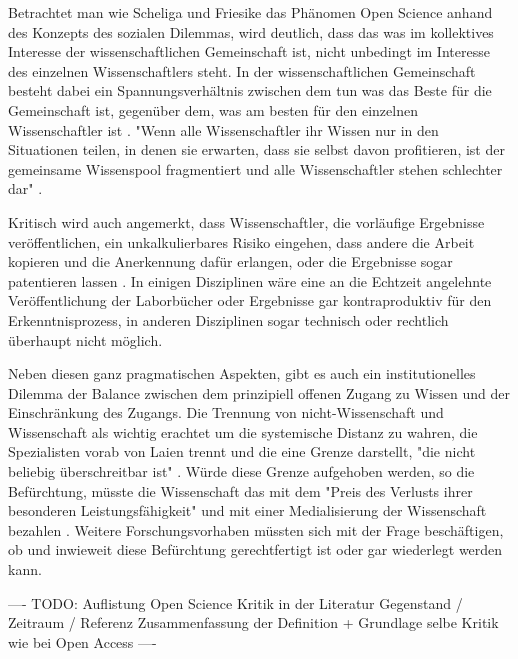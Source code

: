 Betrachtet man wie Scheliga und Friesike das Phänomen Open Science anhand des Konzepts des sozialen Dilemmas, wird deutlich, dass das was im kollektives Interesse der wissenschaftlichen Gemeinschaft ist, nicht unbedingt im Interesse des einzelnen Wissenschaftlers steht. In der wissenschaftlichen Gemeinschaft besteht dabei ein Spannungsverhältnis zwischen dem tun was das Beste für die Gemeinschaft ist, gegenüber dem, was am besten für den einzelnen Wissenschaftler ist \cite{Ekins_2014} \cite{patlak_2010_open} \cite{wein_2010_erwerbung}. "Wenn alle Wissenschaftler ihr Wissen nur in den Situationen teilen, in denen sie erwarten, dass sie selbst davon profitieren, ist der gemeinsame Wissenspool fragmentiert und alle Wissenschaftler stehen schlechter dar" \cite{Scheliga_2014}.

Kritisch wird auch angemerkt, dass Wissenschaftler, die vorläufige Ergebnisse veröffentlichen, ein unkalkulierbares Risiko eingehen, dass andere die Arbeit kopieren und die Anerkennung dafür erlangen, oder die Ergebnisse sogar patentieren lassen \cite{Peters_2014}. In einigen Disziplinen wäre eine an die Echtzeit angelehnte Veröffentlichung der Laborbücher oder Ergebnisse gar kontraproduktiv für den Erkenntnisprozess, in anderen Disziplinen sogar technisch oder rechtlich überhaupt nicht möglich.

Neben diesen ganz pragmatischen Aspekten, gibt es auch ein institutionelles Dilemma der Balance zwischen dem prinzipiell offenen Zugang zu Wissen und der Einschränkung des Zugangs. Die Trennung von nicht-Wissenschaft und Wissenschaft als wichtig erachtet um die systemische Distanz zu wahren, die Spezialisten vorab von Laien trennt und die eine Grenze darstellt, "die nicht beliebig überschreitbar ist" \cite{weingart_2005_wissenschaft}. Würde diese Grenze aufgehoben werden, so die Befürchtung, müsste die Wissenschaft das mit dem "Preis des Verlusts ihrer besonderen Leistungsfähigkeit" und mit einer Medialisierung der Wissenschaft bezahlen \cite{weingart_2005_wissenschaft}. Weitere Forschungsvorhaben müssten sich mit der Frage beschäftigen, ob und inwieweit diese Befürchtung gerechtfertigt ist oder gar wiederlegt werden kann.

---- TODO: Auflistung Open Science Kritik in der Literatur Gegenstand / Zeitraum / Referenz Zusammenfassung der Definition + Grundlage selbe Kritik wie bei Open Access ----

